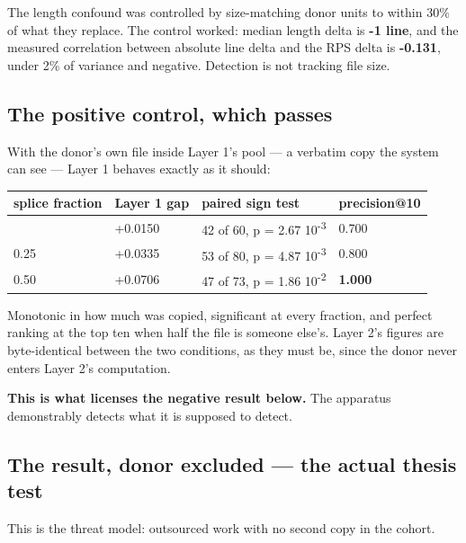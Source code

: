 The length confound was controlled by size-matching donor units to
within 30\% of what they replace. The control worked: median length
delta is \textbf{-1 line}, and the measured correlation between absolute
line delta and the RPS delta is \textbf{-0.131}, under 2\% of variance
and negative. Detection is not tracking file size.

\hypertarget{the-positive-control-which-passes}{%
\subsection{The positive control, which
passes}\label{the-positive-control-which-passes}}

With the donor's own file inside Layer 1's pool --- a verbatim copy the
system can see --- Layer 1 behaves exactly as it should:

\begin{longtable}[]{@{}llll@{}}
\toprule\noalign{}
splice fraction & Layer 1 gap & paired sign test & precision@10 \\
\midrule\noalign{}
\endhead
\bottomrule\noalign{}
\endlastfoot
0.10 & +0.0150 & 42 of 60, p = 2.67 \texttimes{} 10\textsuperscript{-3} & 0.700 \\
0.25 & +0.0335 & 53 of 80, p = 4.87 \texttimes{} 10\textsuperscript{-3} & 0.800 \\
0.50 & +0.0706 & 47 of 73, p = 1.86 \texttimes{} 10\textsuperscript{-2} & \textbf{1.000} \\
\end{longtable}

Monotonic in how much was copied, significant at every fraction, and
perfect ranking at the top ten when half the file is someone else's.
Layer 2's figures are byte-identical between the two conditions, as they
must be, since the donor never enters Layer 2's computation.

\textbf{This is what licenses the negative result below.} The apparatus
demonstrably detects what it is supposed to detect.

\hypertarget{the-result-donor-excluded-the-actual-thesis-test}{%
\subsection{The result, donor excluded --- the actual thesis
test}\label{the-result-donor-excluded-the-actual-thesis-test}}

This is the threat model: outsourced work with no second copy in the
cohort.

